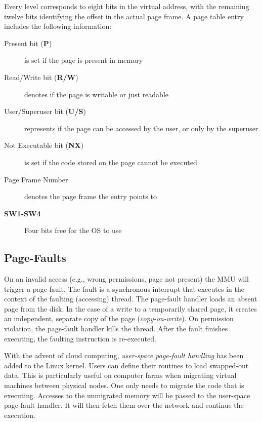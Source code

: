 Every level corresponds to eight bits in the virtual address, with the remaining twelve
bits identifying the offset in the actual page frame. A page table entry
includes the following information:
\begin{description}
    \item[Present bit (\textbf{P})] is set if the page is present in memory
    \item[Read/Write bit (\textbf{R/W})] denotes if the page is writable or just
         readable
    \item[User/Superuser bit (\textbf{U/S})] represents if the page can be 
    accessed by the user, or only by the superuser
    \item[Not Executable bit (\textbf{NX})] is set if the code stored on the 
    page cannot be executed
    \item[Page Frame Number] denotes the page frame the entry points to
    \item[\textbf{SW1-SW4}] Four bits free for the OS to use
\end{description}

\subsection{Page-Faults}
\label{subsec:pagefaults}
On an invalid access (e.g., wrong permissions, page not present) the MMU will
trigger a page-fault. The fault is a synchronous interrupt that executes in the
context of the faulting (accessing) thread. The page-fault handler loads an
absent page from the disk. In the case of a write to a temporarily shared page,
it creates an independent, separate copy of the page (\emph{copy-on-write}). On
permission violation, the page-fault handler kills the thread. After the fault
finishes executing, the faulting instruction is re-executed. 

With the advent of cloud computing, \emph{user-space page-fault handling} has
been added to the Linux kernel. Users can define their routines to load
swapped-out data. This is particularly useful on computer farms when migrating
virtual machines between physical nodes. One only needs to migrate the code that
is executing. Accesses to the unmigrated memory will be passed to the user-space
page-fault handler. It will then fetch them over the network and continue the
execution.

